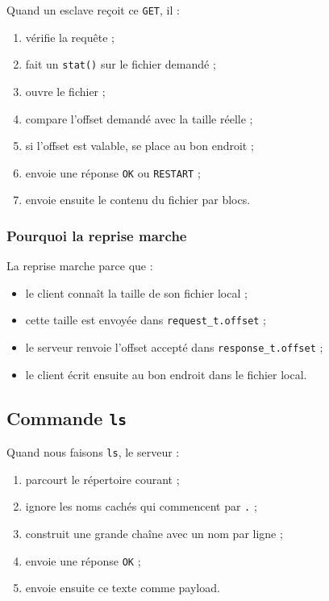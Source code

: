 \documentclass[a4paper,11pt]{article}
\begin{document}
Quand un esclave reçoit ce \texttt{GET}, il :

\begin{enumerate}[leftmargin=*]
    \item vérifie la requête ;
    \item fait un \texttt{stat()} sur le fichier demandé ;
    \item ouvre le fichier ;
    \item compare l'offset demandé avec la taille réelle ;
    \item si l'offset est valable, se place au bon endroit ;
    \item envoie une réponse \texttt{OK} ou \texttt{RESTART} ;
    \item envoie ensuite le contenu du fichier par blocs.
\end{enumerate}

\subsubsection{Pourquoi la reprise marche}

La reprise marche parce que :

\begin{itemize}[leftmargin=*]
    \item le client connaît la taille de son fichier local ;
    \item cette taille est envoyée dans \texttt{request\_t.offset} ;
    \item le serveur renvoie l'offset accepté dans \texttt{response\_t.offset} ;
    \item le client écrit ensuite au bon endroit dans le fichier local.
\end{itemize}

\subsection{Commande \texttt{ls}}

Quand nous faisons \texttt{ls}, le serveur :

\begin{enumerate}[leftmargin=*]
    \item parcourt le répertoire courant ;
    \item ignore les noms cachés qui commencent par \texttt{.} ;
    \item construit une grande chaîne avec un nom par ligne ;
    \item envoie une réponse \texttt{OK} ;
    \item envoie ensuite ce texte comme payload.
\end{enumerate}
\end{document}
